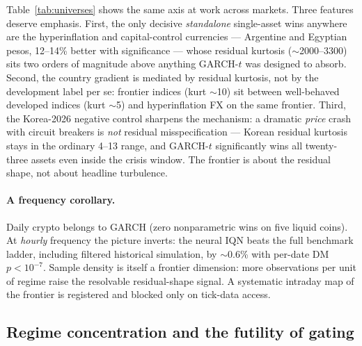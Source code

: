 \documentclass[11pt]{article}
\theoremstyle{remark}
\begin{document}
Table~\ref{tab:universes} shows the same axis at work across markets.
Three features deserve emphasis. First, the only decisive
\emph{standalone} single-asset wins anywhere are the hyperinflation and
capital-control currencies --- Argentine and Egyptian pesos, 12--14\%
better with significance --- whose residual kurtosis ($\sim$2000--3300)
sits two orders of magnitude above anything GARCH-$t$ was designed to
absorb. Second, the country gradient is mediated by residual kurtosis,
not by the development label per se: frontier indices (kurt $\sim$10)
sit between well-behaved developed indices (kurt $\sim$5) and
hyperinflation FX on the same frontier. Third, the Korea-2026 negative
control sharpens the mechanism: a dramatic \emph{price} crash with
circuit breakers is \emph{not} residual misspecification --- Korean
residual kurtosis stays in the ordinary 4--13 range, and GARCH-$t$
significantly wins all twenty-three assets even inside the crisis
window. The frontier is about the residual shape, not about headline
turbulence.

\paragraph{A frequency corollary.} Daily crypto belongs to GARCH (zero
nonparametric wins on five liquid coins). At \emph{hourly} frequency the
picture inverts: the neural IQN beats the full benchmark ladder,
including filtered historical simulation, by $\sim$0.6\% with per-date
DM $p < 10^{-7}$. Sample density is itself a frontier dimension: more
observations per unit of regime raise the resolvable residual-shape
signal. A systematic intraday map of the frontier is registered and
blocked only on tick-data access.

\subsection{Regime concentration and the futility of gating}
\label{sec:gate}
\end{document}
